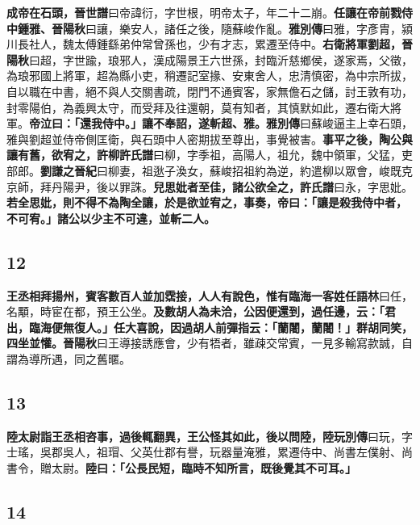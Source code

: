 \textbf{成帝在石頭，}{\footnotesize \textbf{晉世譜}曰帝諱衍，字世根，明帝太子，年二十二崩。}\textbf{任讓在帝前戮侍中鍾雅、}{\footnotesize \textbf{晉陽秋}曰讓，樂安人，諸任之後，隨蘇峻作亂。\textbf{雅別傳}曰雅，字彥胄，潁川長社人，魏太傅鍾繇弟仲常曾孫也，少有才志，累遷至侍中。}\textbf{右衛將軍劉超，}{\footnotesize \textbf{晉陽秋}曰超，字世踰，琅邪人，漢成陽景王六世孫，封臨沂慈鄉侯，遂家焉，父徵，為琅邪國上將軍，超為縣小吏，稍遷記室掾、安東舍人，忠清慎密，為中宗所拔，自以職在中書，絕不與人交關書疏，閉門不通賓客，家無儋石之儲，討王敦有功，封零陽伯，為義興太守，而受拜及往還朝，莫有知者，其慎默如此，遷右衛大將軍。}\textbf{帝泣曰：「還我侍中。」讓不奉詔，遂斬超、雅。}{\footnotesize \textbf{雅別傳}曰蘇峻逼主上幸石頭，雅與劉超並侍帝側匡衛，與石頭中人密期拔至尊出，事覺被害。}\textbf{事平之後，陶公與讓有舊，欲宥之，許柳}{\footnotesize \textbf{許氏譜}曰柳，字季祖，高陽人，祖允，魏中領軍，父猛，吏部郎。\textbf{劉謙之晉紀}曰柳妻，祖逖子渙女，蘇峻招祖約為逆，約遣柳以眾會，峻既克京師，拜丹陽尹，後以罪誅。}\textbf{兒思妣者至佳，諸公欲全之，}{\footnotesize \textbf{許氏譜}曰永，字思妣。}\textbf{若全思妣，則不得不為陶全讓，於是欲並宥之，事奏，帝曰：「讓是殺我侍中者，不可宥。」諸公以少主不可違，並斬二人。}

\subsection*{12}

\textbf{王丞相拜揚州，賓客數百人並加霑接，人人有說色，惟有臨海一客姓任}{\footnotesize \textbf{語林}曰任，名顒，時宦在都，預王公坐。}\textbf{及數胡人為未洽，公因便還到，過任邊，云：「君出，臨海便無復人。」任大喜說，因過胡人前彈指云：「蘭闍，蘭闍！」群胡同笑，四坐並懽。}{\footnotesize \textbf{晉陽秋}曰王導接誘應會，少有牾者，雖疎交常賓，一見多輸寫款誠，自謂為導所遇，同之舊暱。}

\subsection*{13}

\textbf{陸太尉詣王丞相咨事，過後輒翻異，王公怪其如此，後以問陸，}{\footnotesize \textbf{陸玩別傳}曰玩，字士瑤，吳郡吳人，祖瑁、父英仕郡有譽，玩器量淹雅，累遷侍中、尚書左僕射、尚書令，贈太尉。}\textbf{陸曰：「公長民短，臨時不知所言，既後覺其不可耳。」}

\subsection*{14}


